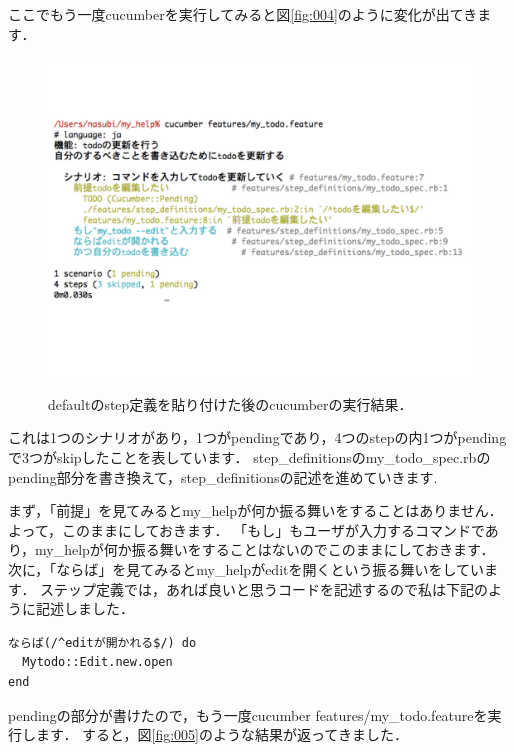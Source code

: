 ここでもう一度cucumberを実行してみると図\ref{fig:004}のように変化が出てきます．

\begin{figure}[htbp]\begin{center}
\includegraphics[width=12cm,bb= 0 0 937 753]{../figs/./my_help_nasu.004.jpeg}
\caption{defaultのstep定義を貼り付けた後のcucumberの実行結果．}
\label{fig:004}
\label{default}\end{center}\end{figure}
これは1つのシナリオがあり，1つがpendingであり，4つのstepの内1つがpendingで3つがskipしたことを表しています．
step\_definitionsのmy\_todo\_spec.rbのpending部分を書き換えて，step\_definitionsの記述を進めていきます.

まず，「前提」を見てみるとmy\_helpが何か振る舞いをすることはありません．
よって，このままにしておきます．
「もし」もユーザが入力するコマンドであり，my\_helpが何か振る舞いをすることはないのでこのままにしておきます．
次に，「ならば」を見てみるとmy\_helpがeditを開くという振る舞いをしています．
ステップ定義では，あれば良いと思うコードを記述するので私は下記のように記述しました．
\begin{lstlisting}[style=customCsh,basicstyle={\scriptsize\ttfamily}]
ならば(/^editが開かれる$/) do
  Mytodo::Edit.new.open
end
\end{lstlisting}
pendingの部分が書けたので，もう一度cucumber features/my\_todo.featureを実行します．
すると，図\ref{fig:005}のような結果が返ってきました．

